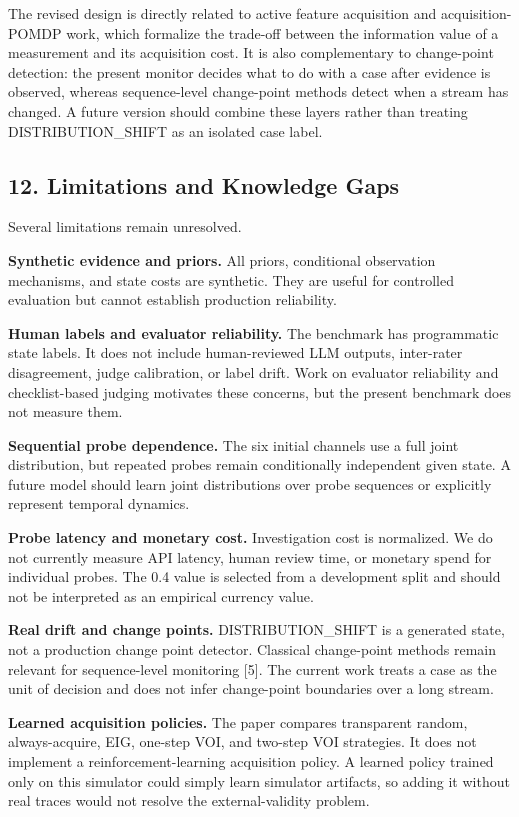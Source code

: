 \documentclass[
]{article}
\begin{document}
The revised design is directly related to active feature acquisition and acquisition-POMDP work, which formalize the trade-off between the information value of a measurement and its acquisition cost. It is also complementary to change-point detection: the present monitor decides what to do with a case after evidence is observed, whereas sequence-level change-point methods detect when a stream has changed. A future version should combine these layers rather than treating DISTRIBUTION\_SHIFT as an isolated case label.

\subsection{12. Limitations and Knowledge Gaps}\label{12-limitations-and-knowledge-gaps}

Several limitations remain unresolved.

\textbf{Synthetic evidence and priors.} All priors, conditional observation mechanisms, and state costs are synthetic. They are useful for controlled evaluation but cannot establish production reliability.

\textbf{Human labels and evaluator reliability.} The benchmark has programmatic state labels. It does not include human-reviewed LLM outputs, inter-rater disagreement, judge calibration, or label drift. Work on evaluator reliability and checklist-based judging motivates these concerns, but the present benchmark does not measure them.

\textbf{Sequential probe dependence.} The six initial channels use a full joint distribution, but repeated probes remain conditionally independent given state. A future model should learn joint distributions over probe sequences or explicitly represent temporal dynamics.

\textbf{Probe latency and monetary cost.} Investigation cost is normalized. We do not currently measure API latency, human review time, or monetary spend for individual probes. The 0.4 value is selected from a development split and should not be interpreted as an empirical currency value.

\textbf{Real drift and change points.} DISTRIBUTION\_SHIFT is a generated state, not a production change point detector. Classical change-point methods remain relevant for sequence-level monitoring {[}5{]}. The current work treats a case as the unit of decision and does not infer change-point boundaries over a long stream.

\textbf{Learned acquisition policies.} The paper compares transparent random, always-acquire, EIG, one-step VOI, and two-step VOI strategies. It does not implement a reinforcement-learning acquisition policy. A learned policy trained only on this simulator could simply learn simulator artifacts, so adding it without real traces would not resolve the external-validity problem.
\end{document}
